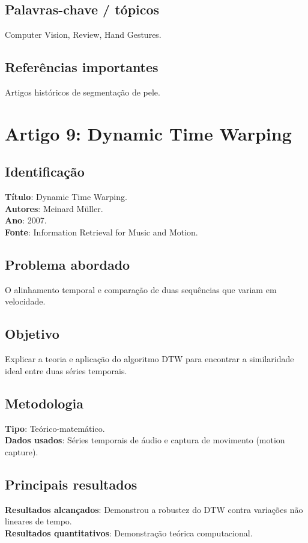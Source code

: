 \documentclass[12pt, a4paper]{article}
\begin{document}
\subsection{Palavras-chave / tópicos}
Computer Vision, Review, Hand Gestures.\\
\subsection{Referências importantes}
Artigos históricos de segmentação de pele.
\newpage

\section{Artigo 9: Dynamic Time Warping}
\subsection{Identificação}
\textbf{Título}: Dynamic Time Warping.\\
\textbf{Autores}: Meinard Müller.\\
\textbf{Ano}: 2007.\\
\textbf{Fonte}: Information Retrieval for Music and Motion.\\
\subsection{Problema abordado}
O alinhamento temporal e comparação de duas sequências que variam em velocidade.\\
\subsection{Objetivo}
Explicar a teoria e aplicação do algoritmo DTW para encontrar a similaridade ideal entre duas séries temporais.\\
\subsection{Metodologia}
\textbf{Tipo}: Teórico-matemático.\\
\textbf{Dados usados}: Séries temporais de áudio e captura de movimento (motion capture).\\
\subsection{Principais resultados}
\textbf{Resultados alcançados}: Demonstrou a robustez do DTW contra variações não lineares de tempo.\\
\textbf{Resultados quantitativos}: Demonstração teórica computacional.\\
\end{document}
